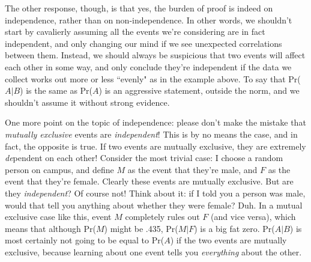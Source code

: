 The other response, though, is that yes, the burden of proof is indeed on
independence, rather than on non-independence. In other words, we shouldn't
start by cavalierly assuming all the events we're considering are in fact
independent, and only changing our mind if we see unexpected correlations
between them. Instead, we should always be suspicious that two events will
affect each other in some way, and only conclude they're independent if the
data we collect works out more or less ``evenly" as in the example above.
To say that Pr($A|B$) is the same as Pr($A$) is an aggressive statement,
outside the norm, and we shouldn't assume it without strong evidence.

One more point on the topic of independence: please don't make the mistake
that \textit{mutually exclusive} events are \textit{independent}! This is
by no means the case, and in fact, the opposite is true. If two events are
mutually exclusive, they are extremely \textit{de}pendent on each other!
Consider the most trivial case: I choose a random person on campus, and
define $M$ as the event that they're male, and $F$ as the event that
they're female. Clearly these events are mutually exclusive. But are they
\textit{independent}? Of course not! Think about it: if I told you a person was
male, would that tell you anything about whether they were female? Duh. In
a mutual exclusive case like this, event $M$ completely rules out $F$ (and
vice versa), which means that although Pr($M$) might be .435, Pr($M|F$) is
a big fat zero. Pr($A|B$) is most certainly not going to be equal to
Pr($A$) if the two events are mutually exclusive, because learning about
one event tells you \textit{everything} about the other.




